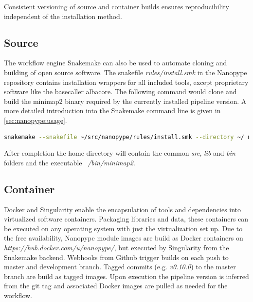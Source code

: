 Consistent versioning of source and container builds ensures reproducibility independent of the installation method.

\subsection{Source}

The workflow engine Snakemake can also be used to automate cloning and building of open source software. The snakefile \textit{rules/install.smk} in the Nanopype repository contains installation wrappers for all included tools, except proprietary software like the basecaller albacore. The following command would clone and build the minimap2 binary required by the currently installed pipeline version. A more detailed introduction into the Snakemake command line is given in \ref{sec:nanopype:usage}. 

\begin{lstlisting}[language=sh, caption=Snakemake tool installation example]
snakemake --snakefile ~/src/nanopype/rules/install.smk --directory ~/ minimap2
\end{lstlisting}

After completion the home directory will contain the common \textit{src}, \textit{lib} and \textit{bin} folders and the executable \textit{~/bin/minimap2}. 



\subsection{Container}

Docker and Singularity enable the encapsulation of tools and dependencies into virtualized software containers. Packaging libraries and data, these containers can be executed on any operating system with just the virtualization set up. Due to the free availability, Nanopype module images are build as Docker containers on \textit{https://hub.docker.com/u/nanopype/}, but executed by Singularity from the Snakemake backend. Webhooks from Github trigger builds on each push to master and development branch. Tagged commits (e.g. \textit{v0.10.0}) to the master branch are build as tagged images. Upon execution the pipeline version is inferred from the git tag and associated Docker images are pulled as needed for the workflow.


